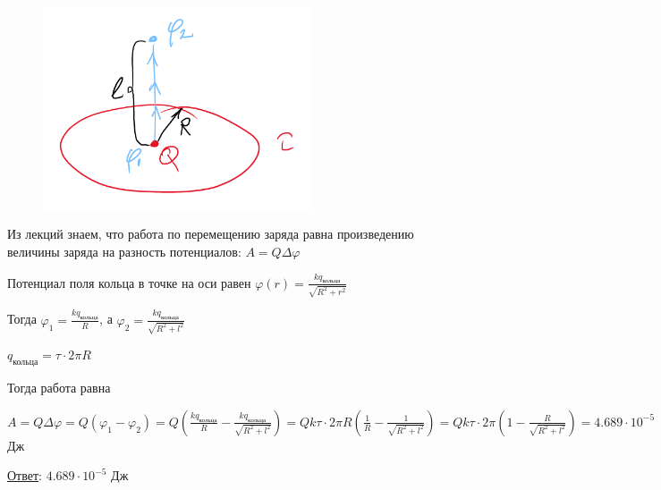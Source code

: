 \begin{minipage}{\textwidth}
    \begin{figure}
        \includegraphics[width=8cm]{physics1/images/physics1_homework_7_3}
    \end{figure}

    Из лекций знаем, что работа по перемещению заряда равна произведению величины заряда на разность потенциалов: 
    $A = Q\Delta\varphi$

    Потенциал поля кольца в точке на оси равен $\varphi(r) = \frac{kq_{\text{кольца}}}{\sqrt{R^2 + r^2}}$

    Тогда $\varphi_1 = \frac{kq_{\text{кольца}}}{R}$, а $\varphi_2 = \frac{kq_{\text{кольца}}}{\sqrt{R^2 + l^2}}$

    $q_{\text{кольца}} = \tau \cdot 2\pi R$

    Тогда работа равна 
    
    $A = Q\Delta \varphi = Q(\varphi_1 - \varphi_2) = 
    Q\left(\frac{kq_{\text{кольца}}}{R} - \frac{kq_{\text{кольца}}}{\sqrt{R^2 + l^2}}\right) = 
    Qk\tau \cdot 2\pi R \left(\frac{1}{R} - \frac{1}{\sqrt{R^2 + l^2}}\right) = 
    Qk\tau \cdot 2\pi \left(1 - \frac{R}{\sqrt{R^2 + l^2}}\right) = 4.689 \cdot 10^{-5}$ Дж

\end{minipage}

\bigvspace

\underline{Ответ}: $4.689 \cdot 10^{-5}$ Дж

